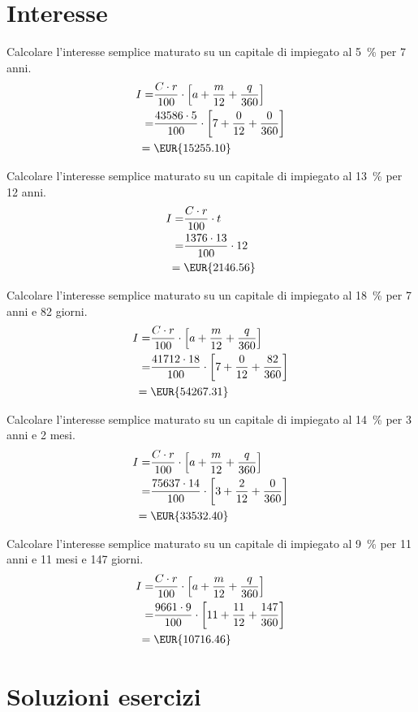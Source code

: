 \section{Interesse}
\begin{exercise}
	Calcolare l'interesse semplice maturato su un capitale di  impiegato al \SI{5}{\percent} per \num{7} anni.
	\tcblower
	\begin{align*}
		I=&\dfrac{C\cdot r}{100}\cdot\left[a+ \dfrac{m}{12}+\dfrac{q}{360}\right]\\
		=&\dfrac{43586\cdot 5}{100}\cdot\left[7+ \dfrac{0}{12}+\dfrac{0}{360}\right]\\
		={}&\mbox{\EUR{15255.10}}
	\end{align*}
\end{exercise} 
\begin{exercise}
	Calcolare l'interesse semplice maturato su un capitale di  impiegato al \SI{13}{\percent} per \num{12} anni.
	\tcblower
	\begin{align*}
		I=&\dfrac{C\cdot r}{100}\cdot t\\
		=&\dfrac{1376\cdot 13}{100}\cdot 12\\
	={}&\mbox{\EUR{2146.56}}
	\end{align*}
\end{exercise} 
\begin{exercise}
	Calcolare l'interesse semplice maturato su un capitale di  impiegato al \SI{18}{\percent} per \num{7} anni e \num{82} giorni.
	\tcblower
	\begin{align*}
		I=&\dfrac{C\cdot r}{100}\cdot\left[a+ \dfrac{m}{12}+\dfrac{q}{360}\right]\\
		=&\dfrac{41712\cdot 18}{100}\cdot\left[7+ \dfrac{0}{12}+\dfrac{82}{360}\right]\\
		={}&\mbox{\EUR{54267.31}}
	\end{align*}
\end{exercise} 
\begin{exercise}
	Calcolare l'interesse semplice maturato su un capitale di  impiegato al \SI{14}{\percent} per \num{3} anni e \num{2} mesi.
	\tcblower
	\begin{align*}
		I=&\dfrac{C\cdot r}{100}\cdot\left[a+ \dfrac{m}{12}+\dfrac{q}{360}\right]\\
		=&\dfrac{75637\cdot 14}{100}\cdot\left[3+ \dfrac{2}{12}+\dfrac{0}{360}\right]\\
		={}&\mbox{\EUR{33532.40}}
	\end{align*}
\end{exercise} 
\begin{exercise}
	Calcolare l'interesse semplice maturato su un capitale di  impiegato al \SI{9}{\percent} per \num{11} anni e \num{11} mesi e \num{147} giorni.
	\tcblower
	\begin{align*}
		I=&\dfrac{C\cdot r}{100}\cdot\left[a+ \dfrac{m}{12}+\dfrac{q}{360}\right]\\
		=&\dfrac{9661\cdot 9}{100}\cdot\left[11+ \dfrac{11}{12}+\dfrac{147}{360}\right]\\
		={}&\mbox{\EUR{10716.46}}
	\end{align*}
\end{exercise} 
\tcbstoprecording
\newpage
\section{Soluzioni esercizi}
\tcbinputrecords